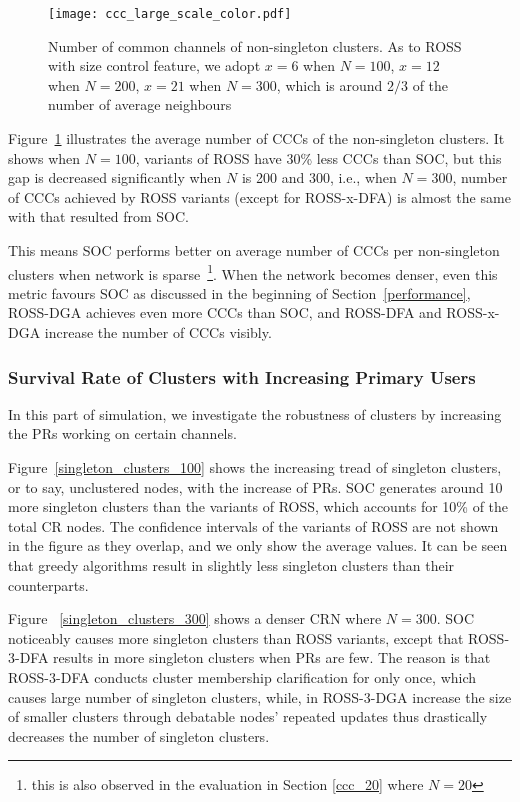 \documentclass[journal,comsoc]{IEEEtran}
\theoremstyle{mytheoremstyle}
\theoremstyle{mytheoremstyle}
\theoremstyle{mytheoremstyle}
\newcommand{\ie}{i.e., }
\begin{document}
\begin{figure}[ht!]
  \centering
  \texttt{[image: ccc\_large\_scale\_color.pdf]}
  \caption{Number of common channels of non-singleton clusters. As to ROSS with size control feature, we adopt $x=6$ when $N=100$, $x=12$ when $N=200$, $x=21$ when $N=300$, which is around $2/3$ of the number of average neighbours}
  \label{ccc_large_scale}
\end{figure}

Figure~\ref{ccc_large_scale} illustrates the average number of CCCs of the non-singleton clusters.
It shows when $N=100$, variants of ROSS have 30\% less CCCs than SOC, but this gap is decreased significantly when $N$ is 200 and 300, \ie when $N=300$, number of CCCs achieved by ROSS variants (except for ROSS-x-DFA) is almost the same with that resulted from SOC.

This means SOC performs better on average number of CCCs per non-singleton clusters when network is sparse~\footnote{this is also observed in the evaluation in Section \ref{ccc_20} where $N=20$}.
When the network becomes denser, even this metric favours SOC as discussed in the beginning of Section~\ref{performance}, ROSS-DGA achieves even more CCCs than SOC, and ROSS-DFA and ROSS-x-DGA increase the number of CCCs visibly.




\subsubsection{Survival Rate of Clusters with Increasing Primary Users}

In this part of simulation, we investigate the robustness of clusters by increasing the PRs working on certain channels.
 
Figure~\ref{singleton_clusters_100} shows the increasing tread of singleton clusters, or to say, unclustered nodes, with the increase of PRs.
SOC generates around 10 more singleton clusters than the variants of ROSS, which accounts for 10\% of the total CR nodes.
The confidence intervals of the variants of ROSS are not shown in the figure as they overlap, and we only show the average values.
It can be seen that greedy algorithms result in slightly less singleton clusters than their counterparts.

Figure ~\ref{singleton_clusters_300} shows a denser CRN where $N=300$.
SOC noticeably causes more singleton clusters than ROSS variants, except that ROSS-3-DFA results in more singleton clusters when PRs are few.
The reason is that ROSS-3-DFA conducts cluster membership clarification for only once, which causes large number of singleton clusters, while, in ROSS-3-DGA increase the size of smaller clusters through debatable nodes' repeated updates thus drastically decreases the number of singleton clusters.
\end{document}
